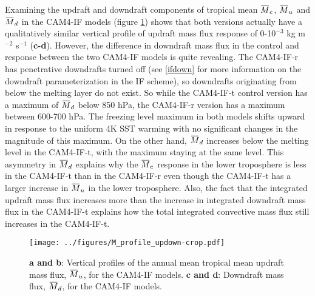 \documentclass[letterpaper,12pt,titlepage,oneside,final]{book}
\newcommand{\overbar}[1]{\mkern 1.5mu\overline{\mkern-1.5mu#1\mkern-1.5mu}\mkern 1.5mu}
\begin{document}
Examining the updraft and downdraft components of tropical mean $\overbar{M}_{c}$, $\overbar{M}_{u}$ and $\overbar{M}_{d}$  in the CAM4-IF models (figure \ref{fig:updown}) shows that both versions actually have a qualitatively similar vertical profile of updraft mass flux response of 0-10$^{-3}$ kg m$^{-2}$ s$^{-1}$ (\textbf{c-d}). However, the difference in downdraft mass flux in the control and response between the two CAM4-IF models is quite revealing. The CAM4-IF-r has penetrative downdrafts turned off (see \ref{ifdown} for more information on the downdraft parameterization in the IF scheme), so downdrafts originating from below the melting layer do not exist. So while the CAM4-IF-t control version has a maximum of $\overbar{M}_{d}$ below 850 hPa, the CAM4-IF-r version has a maximum between 600-700 hPa. The freezing level maximum in both models shifts upward in response to the uniform 4K SST warming with no significant changes in the magnitude of this maximum. On the other hand, $\overbar{M}_{d}$  increases below the melting level in the CAM4-IF-t, with the maximum staying at the same level. This asymmetry in $\overbar{M}_{d}$ explains why the $\overbar{M}_{c}$ response in the lower troposphere is less in the CAM4-IF-t than in the CAM4-IF-r even though the CAM4-IF-t has a larger increase in $\overbar{M}_{u}$ in the lower troposphere. Also, the fact that the integrated updraft mass flux increases more than the increase in integrated downdraft mass flux in the CAM4-IF-t explains how the total integrated convective mass flux still increases in the CAM4-IF-t.
\begin{figure}[H]
\centering
\noindent\texttt{[image: ../figures/M\_profile\_updown-crop.pdf]}\hfill
\caption{\footnotesize \footnotesize  \textbf{a and b}: Vertical profiles of the annual mean tropical mean updraft mass flux, $\overbar{M}_{u}$, for the CAM4-IF models. \textbf{c and d}: Downdraft mass flux, $\overbar{M}_{d}$, for the CAM4-IF models.}
\label{fig:updown}
\end{figure}
\end{document}
